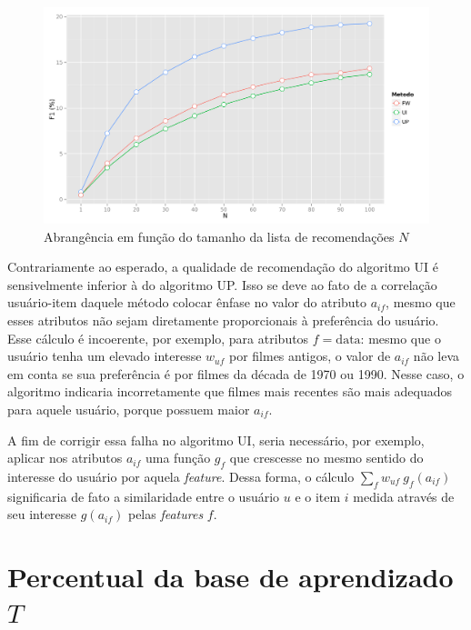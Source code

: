 \begin{figure}[htp]
    \begin{center}
    \includegraphics[width=1\textwidth]{img/F1_N}
    \end{center}
    \label{fig:F1_N}
    \caption{Abrangência em função do tamanho da lista de recomendações $N$}
\end{figure}

Contrariamente ao esperado, a qualidade de recomendação do algoritmo UI é sensivelmente inferior à do algoritmo UP. Isso se deve ao fato de a correlação usuário-item daquele método colocar ênfase no valor do atributo $a_{if}$, mesmo que esses atributos não sejam diretamente proporcionais à preferência do usuário. Esse cálculo é incoerente, por exemplo, para atributos $f=\mathrm{data}$: mesmo que o usuário tenha um elevado interesse $w_{uf}$ por filmes antigos, o valor de $a_{if}$ não leva em conta se sua preferência é por filmes da década de 1970 ou 1990. Nesse caso, o algoritmo indicaria incorretamente que filmes mais recentes são mais adequados para aquele usuário, porque possuem maior $a_{if}$.

A fim de corrigir essa falha no algoritmo UI, seria necessário, por exemplo, aplicar nos atributos $a_{if}$ uma função $g_f$ que crescesse no mesmo sentido do interesse do usuário por aquela \textit{feature}. Dessa forma, o cálculo $\sum_f w_{uf}~g_f\left(a_{if}\right)$ significaria de fato a similaridade entre o usuário $u$ e o item $i$ medida através de seu interesse $g\left(a_{if}\right)$ pelas \textit{features} $f$.



\section{Percentual da base de aprendizado $T$} %
\label{sec:percentual_da_base_de_aprendizado_}

